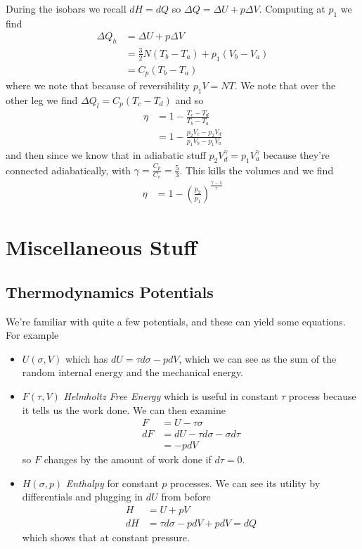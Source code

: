 \documentclass[10pt,twocolumn]{article}
\begin{document}
During the isobars we recall $dH = dQ$ so $\Delta Q = \Delta U + p\Delta V$. Computing at $p_1$ we find
\begin{align}
    \Delta Q_h &= \Delta U + p\Delta V\\
    &= \frac{3}{2}N\left( T_b - T_a \right) + p_1\left( V_b - V_a \right)\\
    &= C_p \left( T_b - T_a \right)
\end{align}
where we note that because of reversibility $p_1V = NT$. We note that over the other leg we find $\Delta Q_l = C_p\left( T_c - T_d \right)$ and so
\begin{align}
    \eta &= 1 - \frac{T_c - T_d}{T_b - T_a}\\
    &= 1 - \frac{p_2V_c - p_2V_d}{p_1V_b - p_1V_a}
\end{align}
and then since we know that in adiabatic stuff $p_2V_d^\gamma = p_1V_a^\gamma$ because they're connected adiabatically, with $\gamma = \frac{C_p}{C_v} = \frac{5}{3}$. This kills the volumes and we find
\begin{align}
    \eta &= 1 - \left( \frac{p_2}{p_1} \right)^{\frac{\gamma-1}{\gamma}}
\end{align}

\section{Miscellaneous Stuff}

\subsection{Thermodynamics Potentials}

We're familiar with quite a few potentials, and these can yield some equations. For example
\begin{itemize}
    \item $U(\sigma,V)$ which has $dU = \tau d\sigma - p dV$, which we can see as the sum of the random internal energy and the mechanical energy.
    \item $F(\tau,V)$ \emph{Helmholtz Free Energy} which is useful in constant $\tau$ process because it tells us the work done. We can then examine
        \begin{align}
            F &= U-\tau\sigma\\
            dF &= dU - \tau d\sigma - \sigma d\tau\\
            &= -pdV
        \end{align}
        so $F$ changes by the amount of work done if $d\tau = 0$. 
    \item $H(\sigma,p)$ \emph{Enthalpy} for constant $p$ processes. We can see its utility by differentials and plugging in $dU$ from before
        \begin{align}
            H &= U + pV\\
            dH &= \tau d\sigma - pdV + pdV = dQ
        \end{align}
        which shows that at constant pressure.
\end{itemize}
\end{document}
